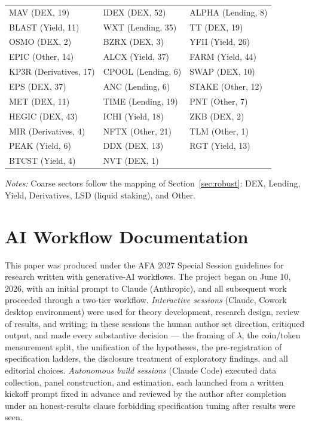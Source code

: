 \documentclass[12pt]{article}
\begin{document}
\begin{table}[p]
\begin{tabular}{lll}
MAV (DEX, 19) & IDEX (DEX, 52) & ALPHA (Lending, 8) \\
BLAST (Yield, 11) & WXT (Lending, 35) & TT (DEX, 19) \\
OSMO (DEX, 2) & BZRX (DEX, 3) & YFII (Yield, 26) \\
EPIC (Other, 14) & ALCX (Yield, 37) & FARM (Yield, 44) \\
KP3R (Derivatives, 17) & CPOOL (Lending, 6) & SWAP (DEX, 10) \\
EPS (DEX, 37) & ANC (Lending, 6) & STAKE (Other, 12) \\
MET (DEX, 11) & TIME (Lending, 19) & PNT (Other, 7) \\
HEGIC (DEX, 43) & ICHI (Yield, 18) & ZKB (DEX, 2) \\
MIR (Derivatives, 4) & NFTX (Other, 21) & TLM (Other, 1) \\
PEAK (Yield, 6) & DDX (DEX, 13) & RGT (Yield, 13) \\
BTCST (Yield, 4) & NVT (DEX, 1) \\
\bottomrule
\end{tabular}
\smallskip

\parbox{0.92\linewidth}{\footnotesize
\textit{Notes:} Coarse sectors follow the mapping of Section~\ref{sec:robust}: DEX,
Lending, Yield, Derivatives, LSD (liquid staking), and Other.}
\end{table}




\FloatBarrier
\section{AI Workflow Documentation}
\label{app:workflow}

This paper was produced under the AFA 2027 Special Session guidelines for research
written with generative-AI workflows. The project began on June 10, 2026, with an
initial prompt to Claude (Anthropic), and all subsequent work proceeded through a
two-tier workflow. \textit{Interactive sessions} (Claude, Cowork desktop environment)
were used for theory development, research design, review of results, and writing; in
these sessions the human author set direction, critiqued output, and made every
substantive decision --- the framing of $\lambda$, the coin/token measurement split,
the unification of the hypotheses, the pre-registration of specification ladders, the
disclosure treatment of exploratory findings, and all editorial choices.
\textit{Autonomous build sessions} (Claude Code) executed data collection, panel
construction, and estimation, each launched from a written kickoff prompt fixed in
advance and reviewed by the author after completion under an honest-results clause
forbidding specification tuning after results were seen.
\end{document}
